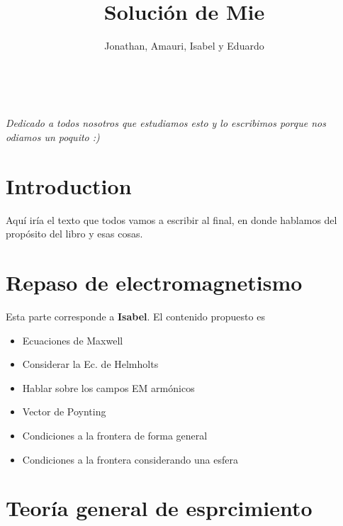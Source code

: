 \documentclass[12pts,a4paper]{book}
\title{Solución de Mie}
\author{Jonathan, Amauri, Isabel y Eduardo}
\begin{document}
\frontmatter

\blankpage

\maketitle



\tableofcontents

\listoffigures

\listoftables

\cleardoublepage
~\vfill
\begin{doublespace}
\noindent\fontsize{18}{22}\selectfont\itshape
\noindent
Dedicado a todos nosotros que estudiamos esto y lo escribimos porque nos odiamos un poquito :)
\end{doublespace}
\vfill
\vfill


\cleardoublepage
\chapter*{Introduction}

Aquí iría el texto que todos vamos a escribir al final, en donde hablamos del propósito del libro y esas cosas.


\mainmatter


\chapter{Repaso de electromagnetismo}
\label{ch:repasoEM} %

Esta parte corresponde a \textbf{Isabel}. El contenido propuesto es

\begin{itemize}
 \item Ecuaciones de Maxwell
 \item Considerar la Ec. de Helmholts
 \item Hablar sobre los campos EM armónicos
 \item Vector de Poynting
 \item Condiciones a la frontera de forma general
 \item Condiciones a la frontera considerando una esfera
\end{itemize}

\chapter{Teoría general de esprcimiento}
\label{ch:EsparcimientoGral} %
\end{document}
